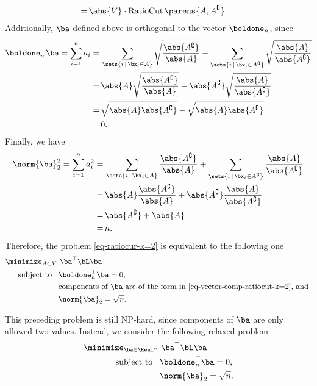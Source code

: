 \documentclass[12pt]{article}
\begin{document}
\begin{enumerate}[label=\textbf{\arabic*.}]
\begin{enumerate}
\begin{align*}
			= & \, \abs{V} \cdot \mathrm{RatioCut} \, \parens{A, A^{\complement}}. 
		\end{align*}
		Additionally, $\ba$ defined above is orthogonal to the vector $\boldone_n$, since 
		\begin{align*}
			\boldone_n^\top \ba = \sum_{i=1}^n a_i = & \, \sum_{\sets{i \,\vert\, \bx_i \in A}} \sqrt{\frac{\abs{A^{\complement}}}{\abs{A}}} - \sum_{\sets{i \,\vert\, \bx_i \in A^{\complement}}} \sqrt{\frac{\abs{A}}{\abs{A^{\complement}}}} \\ 
			= & \, \abs{A} \sqrt{\frac{\abs{A^{\complement}}}{\abs{A}}} - \abs{A^{\complement}} \sqrt{\frac{\abs{A}}{\abs{A^{\complement}}}} \\ 
			= & \, \sqrt{\abs{A} \abs{A^{\complement}}} - \sqrt{\abs{A} \abs{A^{\complement}}} \\ 
			= & \, 0. 
		\end{align*}
		Finally, we have 
		\begin{align*}
			\norm{\ba}_2^2 = \sum_{i=1}^n a_i^2 = & \, \sum_{\sets{i \,\vert\, \bx_i \in A}} \frac{\abs{A^{\complement}}}{\abs{A}} + \sum_{\sets{i \,\vert\, \bx_i \in A^{\complement}}} \frac{\abs{A}}{\abs{A^{\complement}}} \\ 
			= & \, \abs{A} \frac{\abs{A^{\complement}}}{\abs{A}} + \abs{A^{\complement}} \frac{\abs{A}}{\abs{A^{\complement}}} \\ 
			= & \, \abs{A^{\complement}} + \abs{A} \\ 
			= & \, n. 
		\end{align*}
		Therefore, the problem \eqref{eq-ratiocur-k=2} is equivalent to the following one 
		\begin{align*}
			\minimize_{A \subset V} & \, \, \ba^\top \bL \ba \\ 
			\text{ subject to } \ & \, \boldone_n^\top \ba = 0, \\ 
			& \, \text{components of $\ba$ are of the form in \eqref{eq-vector-comp-ratiocut-k=2}, and } \\ 
			& \, \norm{\ba}_2 = \sqrt{n}. 
		\end{align*}
		
		This preceding problem is still NP-hard, since components of $\ba$ are only allowed two values. Instead, we consider the following relaxed problem 
		\begin{align*}
			\minimize_{\ba \in \Real^n} & \, \, \ba^\top \bL \ba \\ 
			\text{ subject to } \ & \, \boldone_n^\top \ba = 0, \\ 
			& \, \norm{\ba}_2 = \sqrt{n}. 
		\end{align*}
		

\end{enumerate}
\end{enumerate}
\end{document}
